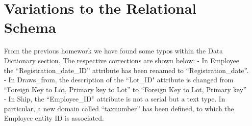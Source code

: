 \section{Variations to the Relational Schema}

From the previous homework we have found some typos within the Data Dictionary section. The respective corrections are shown below:
- In Employee the ``Registration\_date\_ID'' attribute has been renamed to ``Registration\_date''.
- In Draws\_from, the description of the ``Lot\_ID" attribute is changed from ``Foreign Key to Lot, Primary key to Lot'' to ``Foreign Key to Lot, Primary key''
- In Ship, the ``Employee\_ID'' attribute is not a serial but a text type. In particular, a new domain called ``taxnumber'' has been defined, to which the Employee entity ID is associated.